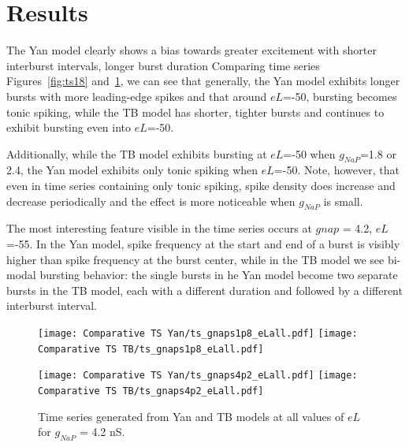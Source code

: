 \documentclass[11pt]{article}
\begin{document}
\oddsidemargin -0.22in
\evensidemargin -0.22in
\topmargin 0.05in
\topskip 0.25in
\headheight 0.05in
\headsep 0.25in

\graphicspath{{"../Data and Analysis/long TB Yan/plots/"}{"../Data and Analysis/short TB Yan/plots/"}}

\FloatBarrier
\section{Results}
The Yan model clearly shows a bias towards greater excitement with shorter interburst intervals, longer burst duration
Comparing time series Figures~\ref{fig:ts18} and~\ref{fig:ts42}, we can see that generally, the Yan model exhibits longer bursts with more leading-edge spikes and that around $eL$=-50, bursting becomes tonic spiking, while the TB model has shorter, tighter bursts and continues to exhibit bursting even into $eL$=-50. 

Additionally, while the TB model exhibits bursting at $eL$=-50 when $g_{NaP}$=1.8 or 2.4, the Yan model exhibits only tonic spiking when  $eL$=-50. Note, however, that even in time series containing only tonic spiking, spike density does increase and decrease periodically and the effect is more noticeable when $g_{NaP}$ is small. 

The most interesting feature visible in the time series occurs at $gnap$ = 4.2, $eL$=-55. In the Yan model, spike frequency at the start and end of a burst is visibly higher than spike frequency at the burst center, while in the TB model we see bi-modal bursting behavior: the single bursts in he Yan model become two separate bursts in the TB model, each with a different duration and followed by a different interburst interval. 

\begin{figure}[h]
	\centering
	\texttt{[image: Comparative TS Yan/ts\_gnaps1p8\_eLall.pdf]}
	\texttt{[image: Comparative TS TB/ts\_gnaps1p8\_eLall.pdf]}
	\caption{Time series generated from Yan and TB models at all values of $eL$ for $g_{NaP}$ = 1.8 nS.}
	\label{fig:ts18}

	\texttt{[image: Comparative TS Yan/ts\_gnaps4p2\_eLall.pdf]}
	\texttt{[image: Comparative TS TB/ts\_gnaps4p2\_eLall.pdf]}
	\caption{Time series generated from Yan and TB models at all values of $eL$ for $g_{NaP}$ = 4.2 nS.}
	\label{fig:ts42}
\end{figure}
\end{document}
